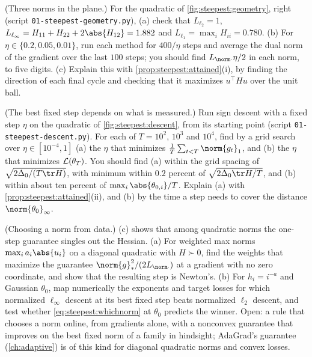 \begin{refsection}
\begin{exercises}
\item \simulation (Three norms in the plane.) For the quadratic of \cref{fig:steepest:geometry}, right (script \texttt{01-steepest-geometry.py}), (a) check that $L_{\ell_2}=1$, $L_{\ell_\infty}=H_{11}+H_{22}+2\abs{H_{12}}=1.882$ and $L_{\ell_1}=\max_iH_{ii}=0.780$. (b) For $\eta\in\{0.2,0.05,0.01\}$, run each method for $400/\eta$ steps and average the dual norm of the gradient over the last $100$ steps; you should find $L_{\norm\cdot}\eta/2$ in each norm, to five digits. (c) Explain this with \cref{prop:steepest:attained}(i), by finding the direction of each final cycle and checking that it maximizes $u^\top Hu$ over the unit ball.\label{ex:steepest:plane}

\item \simulation (The best fixed step depends on what is measured.) Run sign descent with a fixed step $\eta$ on the quadratic of \cref{fig:steepest:descent}, from its starting point (script \texttt{01-steepest-descent.py}). For each of $T=10^2$, $10^3$ and $10^4$, find by a grid search over $\eta\in[10^{-4},1]$ (a) the $\eta$ that minimizes $\frac1T\sum_{t<T}\norm{g_t}_1$, and (b) the $\eta$ that minimizes $\mathcal{L}(\theta_T)$. You should find (a) within the grid spacing of $\sqrt{2\Delta_0/(T\tr H)}$, with minimum within $0.2$ percent of $\sqrt{2\Delta_0\tr H/T}$, and (b) within about ten percent of $\max_i\abs{\theta_{0,i}}/T$. Explain (a) with \cref{prop:steepest:attained}(ii), and (b) by the time a step needs to cover the distance $\norm{\theta_0}_\infty$.\label{ex:steepest:beststep}

\item \research (Choosing a norm from data.) (c) shows that among quadratic norms the one-step guarantee singles out the Hessian. (a) For weighted max norms $\max_ia_i\abs{u_i}$ on a diagonal quadratic with $H\succ0$, find the weights that maximize the guarantee $\norm{g}_*^2/(2L_{\norm\cdot})$ at a gradient with no zero coordinate, and show that the resulting step is Newton's. (b) For $h_i=i^{-a}$ and Gaussian $\theta_0$, map numerically the exponents and target losses for which normalized $\ell_\infty$ descent at its best fixed step beats normalized $\ell_2$ descent, and test whether \eqref{eq:steepest:whichnorm} at $\theta_0$ predicts the winner. Open: a rule that chooses a norm online, from gradients alone, with a nonconvex guarantee that improves on the best fixed norm of a family in hindsight; AdaGrad's guarantee (\cref{ch:adaptive}) is of this kind for diagonal quadratic norms and convex losses.\label{ex:steepest:choose}
\end{exercises}


\end{refsection}
